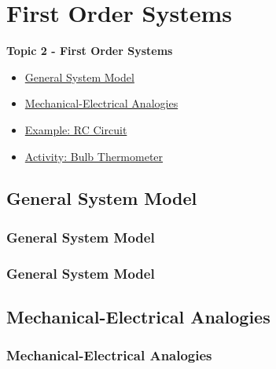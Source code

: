 \documentclass[fleqn]{beamer} %
\newcommand{\sectionIItitle}{First Order Systems}
\newcommand{\sectionIIsubsectionItitle}{General System Model}
\newcommand{\sectionIIsubsectionIItitle}{Mechanical-Electrical Analogies}
\newcommand{\sectionIIsubsectionIIItitle}{Example: RC Circuit}
\newcommand{\sectionIIsubsectionIVtitle}{Activity: Bulb Thermometer}
\begin{document}
	
	\section{\sectionIItitle}\label{sectionII}

		\begin{frame}
			\large \textbf{Topic 2 - \sectionIItitle} \vspace{3mm}\\

			\begin{itemize}
				\item \hyperlink{sectionIIsubsectionI}{\sectionIIsubsectionItitle} \vspc %
				\item \hyperlink{sectionIIsubsectionII}{\sectionIIsubsectionIItitle} \vspc %
				\item \hyperlink{sectionIIsubsectionIII}{\sectionIIsubsectionIIItitle} \vspc %
				\item \hyperlink{sectionIIsubsectionIV}{\sectionIIsubsectionIVtitle} \vspc %
			\end{itemize}

		\end{frame}

		\subsection{\sectionIIsubsectionItitle}\label{sectionIIsubsectionI}

			\begin{frame}[label=sectionIIsubsectionI]
				\frametitle{\sectionIIsubsectionItitle}

			\end{frame}

		    \begin{frame}[label=sectionIIsubsectionI]
				\frametitle{\sectionIIsubsectionItitle}

			



			\end{frame}	

		\subsection{\sectionIIsubsectionIItitle}\label{sectionIIsubsectionII}

			\begin{frame}
				\frametitle{\sectionIIsubsectionIItitle}



			\end{frame}
\end{document}
